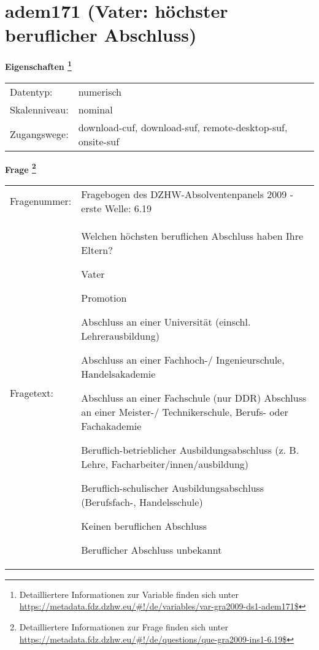 
    \setcounter{footnote}{0}

    \vspace*{-1.8cm}
	\section{adem171 (Vater: höchster beruflicher Abschluss)}
	\label{section:adem171}



    \vspace*{0.5cm}
    \noindent\textbf{Eigenschaften
	\footnote{Detailliertere Informationen zur Variable finden sich unter
		\url{https://metadata.fdz.dzhw.eu/\#!/de/variables/var-gra2009-ds1-adem171$}}}\\
	\begin{tabularx}{\hsize}{@{}lX}
	Datentyp: & numerisch \\
	Skalenniveau: & nominal \\
	Zugangswege: &
	  download-cuf, 
	  download-suf, 
	  remote-desktop-suf, 
	  onsite-suf
 \\
    \end{tabularx}



				\vspace*{0.5cm}
                \noindent\textbf{Frage
	                \footnote{Detailliertere Informationen zur Frage finden sich unter
		              \url{https://metadata.fdz.dzhw.eu/\#!/de/questions/que-gra2009-ins1-6.19$}}}\\
				\begin{tabularx}{\hsize}{@{}lX}
					Fragenummer: &
					  Fragebogen des DZHW-Absolventenpanels 2009 - erste Welle:
					  6.19
 \\
					Fragetext: & Welchen höchsten beruflichen Abschluss haben Ihre Eltern?\par  Vater\par  Promotion\par  Abschluss an einer Universität (einschl. Lehrerausbildung)\par  Abschluss an einer Fachhoch-/ Ingenieurschule, Handelsakademie\par  Abschluss an einer Fachschule (nur DDR) Abschluss an einer Meister-/ Technikerschule, Berufs- oder Fachakademie\par  Beruflich-betrieblicher Ausbildungsabschluss (z. B. Lehre, Facharbeiter/innen/ausbildung)\par  Beruflich-schulischer Ausbildungsabschluss (Berufsfach-, Handelsschule)\par  Keinen beruflichen Abschluss\par  Beruflicher Abschluss unbekannt \\
				\end{tabularx}





